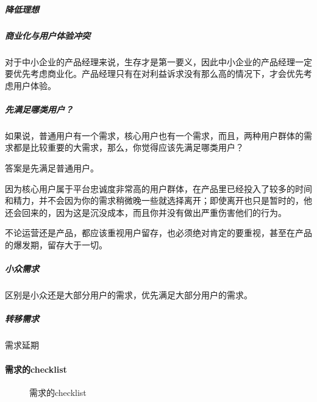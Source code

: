 \documentclass[letterpaper,10pt,english]{sphinxmanual}
\begin{document}
\subparagraph{降低理想}
\label{\detokenize{chapter_introduction/need:id10}}

\subparagraph{商业化与用户体验冲突}
\label{\detokenize{chapter_introduction/need:id11}}
对于中小企业的产品经理来说，生存才是第一要义，因此中小企业的产品经理一定要优先考虑商业化。产品经理只有在对利益诉求没有那么高的情况下，才会优先考虑用户体验。%
\begin{footnote}[34]\sphinxAtStartFootnote
{}
%
\end{footnote}


\subparagraph{先满足哪类用户？}
\label{\detokenize{chapter_introduction/need:id12}}
如果说，普通用户有一个需求，核心用户也有一个需求，而且，两种用户群体的需求都是比较重要的大需求，那么，你觉得应该先满足哪类用户？

答案是先满足普通用户。

因为核心用户属于平台忠诚度非常高的用户群体，在产品里已经投入了较多的时间和精力，并不会因为你的需求稍微晚一些就选择离开；即使离开也只是暂时的，他还会回来的，因为这是沉没成本，而且你并没有做出严重伤害他们的行为。

不论运营还是产品，都应该重视用户留存，也必须绝对肯定的要重视，甚至在产品的爆发期，留存大于一切。


\subparagraph{小众需求}
\label{\detokenize{chapter_introduction/need:id13}}
区别是小众还是大部分用户的需求，优先满足大部分用户的需求。%
\begin{footnote}[35]\sphinxAtStartFootnote
{}
%
\end{footnote}


\subparagraph{转移需求}
\label{\detokenize{chapter_introduction/need:id14}}
需求延期


\paragraph{需求的checklist}
\label{\detokenize{chapter_introduction/need:checklist}}
\begin{figure}[H]
\centering
\capstart

\noindent{}
\caption{需求的checklist}\label{\detokenize{chapter_introduction/need:id22}}\end{figure}
\end{document}
